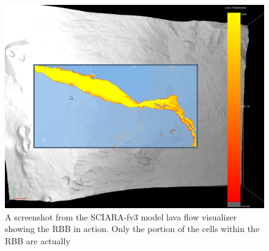\begin{figure}
\begin{center}
  \includegraphics[scale=0.35]{./images/RBBSchreenShot}
  \caption{A screenshot from the SCIARA-fv3 model lava flow visualizer showing
  the RBB in action. Only the portion of the cells within the RBB are
  actually }
  \label{fig:RBBSchreenShot}
\end{center}
\end{figure}

